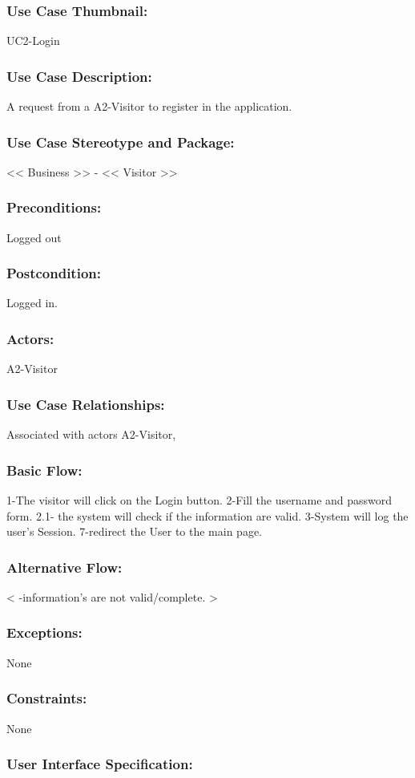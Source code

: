 \documentclass[11pt, openany]{report}
\begin{document}
\subsubsection{Use Case Thumbnail:}
UC2-Login
\subsubsection{Use Case Description:}
A request from a A2-Visitor to register in the application.
\subsubsection{Use Case Stereotype and Package:}
<< Business >> - << Visitor >>
\subsubsection{Preconditions:}
Logged out
\subsubsection{Postcondition:}
Logged in.
\subsubsection{Actors:}
A2-Visitor
\subsubsection{Use Case Relationships:}
Associated with actors A2-Visitor,
\subsubsection{Basic Flow:}
1-The visitor will click on the Login button.
2-Fill the username and password form.
2.1- the system will check if the information are valid.
3-System will log the user's Session.
7-redirect the User to the main page.
\subsubsection{Alternative Flow:}
< -information's are not valid/complete. >
\subsubsection{Exceptions:}
None
\subsubsection{Constraints:}
None
\subsubsection{User Interface Specification:}
\end{document}
